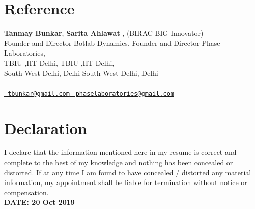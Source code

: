 \documentclass[10pt,a4paper,sans]{moderncv} %
\begin{document}


\section{Reference}
\textbf{Tanmay Bunkar},                          \hspace{5.06cm}                   \textbf{Sarita Ahlawat} , (BIRAC BIG Innovator) \\                                                                                    
Founder and Director Botlab Dynamics,     \hspace{1.8cm}      Founder and Director Phase Laboratories,  \\                                                        
TBIU ,IIT Delhi,                                          \hspace{5.21cm}     TBIU ,IIT Delhi,   \\                  
South West Delhi, Delhi                                \hspace{4.1cm}     South West Delhi, Delhi   \\                
                            \hspace{5.5cm}    \\    
\emailsymbol \href{mailto: tbunkar@gmail.com}{\nolinkurl{ tbunkar@gmail.com} } \hspace{4cm} \emailsymbol \href{mailto: phaselaboratories@gmail.com}{\nolinkurl{ phaselaboratories@gmail.com} }




\section{Declaration}
 I declare that the information mentioned here in my resume is correct and complete to the best of my knowledge and nothing has been concealed or distorted. 
If at any time I am found to have concealed / distorted any material information, my appointment shall be liable for termination without notice or compensation. \\


\textbf{DATE: 20 Oct 2019}
\end{document}
